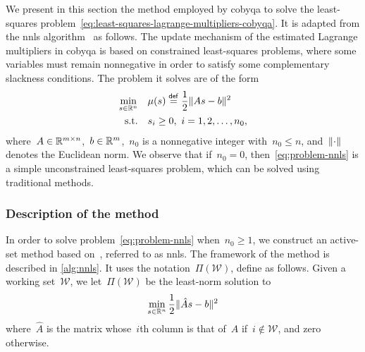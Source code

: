 We present in this section the method employed by \gls{cobyqa} to solve the least-squares problem~\cref{eq:least-squares-lagrange-multipliers-cobyqa}.
It is adapted from the \gls{nnls} algorithm~\cite[Alg.~23.10]{Lawson_Hanson_1987} as follows.
The update mechanism of the estimated Lagrange multipliers in \gls{cobyqa} is based on constrained least-squares problems, where some variables must remain nonnegative in order to satisfy some complementary slackness conditions.
The problem it solves are of the form
\begin{subequations}
    \label{eq:problem-nnls}
    \begin{align}
        \min_{\sstep \in \R^n}  & \quad \mu(\sstep) \eqdef \frac{1}{2} \norm{A \sstep - b}^2\\
        \text{s.t.}             & \quad \sstep_i \ge 0, ~ i = 1, 2, \dots, n_0,
    \end{align}
\end{subequations}
where~$A \in \mathbb{R}^{m \times n}$,~$b \in \mathbb{R}^m$,~$n_0$ is a nonnegative integer with~$n_0 \le n$, and~$\lVert\cdot\rVert$ denotes the Euclidean norm.
We observe that if~$n_0 = 0$, then~\cref{eq:problem-nnls} is a simple unconstrained least-squares problem, which can be solved using traditional methods.

\subsubsection{Description of the method}

In order to solve problem~\cref{eq:problem-nnls} when~$n_0 \ge 1$, we construct an active-set method based on~\cite[Alg.~23.10]{Lawson_Hanson_1987}, referred to as \gls{nnls}.
The framework of the method is described in \cref{alg:nnls}.
It uses the notation~$\Pi(\mathcal{W})$, define as follows.
Given a working set~$\mathcal{W}$, we let~$\Pi(\mathcal{W})$ be the least-norm solution to
\begin{equation*}
    \min_{\sstep \in \R^n} \frac{1}{2} \norm{\hat{A} \sstep - b}^2
\end{equation*}
where~$\hat{A}$ is the matrix whose~$i$th column is that of~$A$ if~$i \notin \mathcal{W}$, and zero otherwise.


